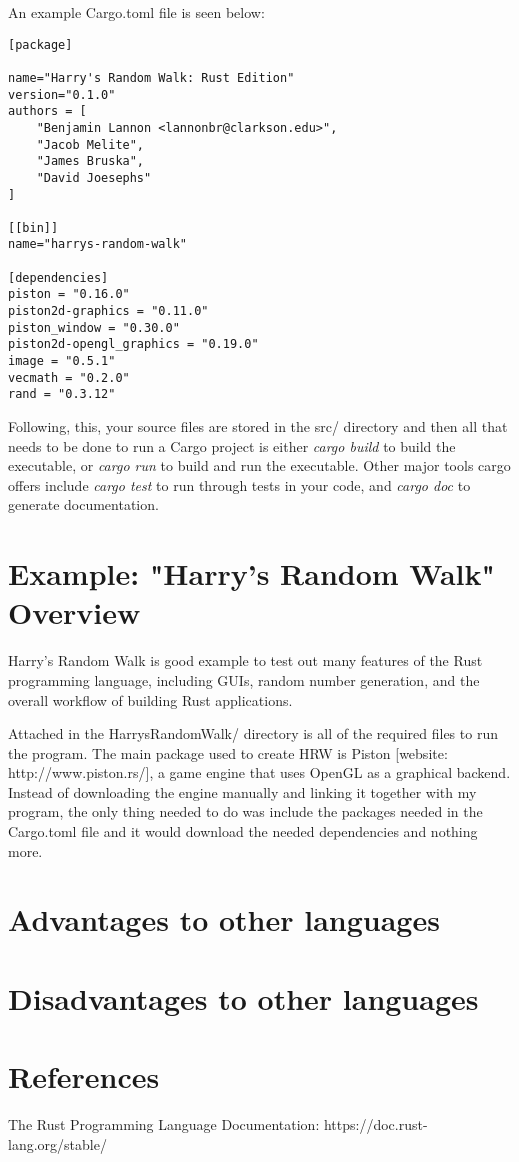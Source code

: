 \documentclass{article}
\begin{document}
An example Cargo.toml file is seen below:

\begin{lstlisting}
[package]

name="Harry's Random Walk: Rust Edition"
version="0.1.0"
authors = [
	"Benjamin Lannon <lannonbr@clarkson.edu>",
	"Jacob Melite",
	"James Bruska",
	"David Joesephs"
]

[[bin]]
name="harrys-random-walk"

[dependencies]
piston = "0.16.0"
piston2d-graphics = "0.11.0"
piston_window = "0.30.0"
piston2d-opengl_graphics = "0.19.0"
image = "0.5.1"
vecmath = "0.2.0"
rand = "0.3.12"
\end{lstlisting}

Following, this, your source files are stored in the src/ directory and then all that needs to be done to run a Cargo project is either \emph{cargo build} to build the executable, or \emph{cargo run} to build and run the executable. Other major tools cargo offers include \emph{cargo test} to run through tests in your code, and \emph{cargo doc} to generate documentation.

\section{Example: "Harry's Random Walk" Overview}
Harry's Random Walk is good example to test out many features of the Rust programming language, including GUIs, random number generation, and the overall workflow of building Rust applications.

Attached in the HarrysRandomWalk/ directory is all of the required files to run the program. The main package used to create HRW is Piston [website: http://www.piston.rs/], a game engine that uses OpenGL as a graphical backend. Instead of downloading the engine manually and linking it together with my program, the only thing needed to do was include the packages needed in the Cargo.toml file and it would download the needed dependencies and nothing more.

\section{Advantages to other languages}

\section{Disadvantages to other languages}

\section{References}
The Rust Programming Language Documentation: https://doc.rust-lang.org/stable/
\end{document}
